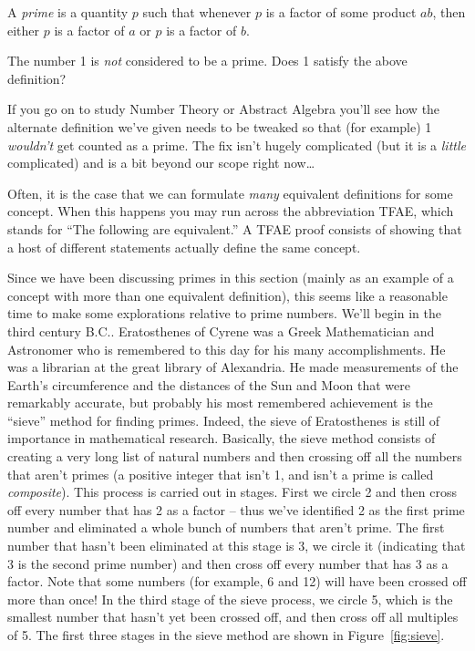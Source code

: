\begin{defi}
A {\em prime} is a quantity $p$ such that whenever $p$ is a 
factor of some product $ab$, then either $p$ is a factor of
$a$ or $p$ is a factor of $b$.
\end{defi}

\begin{exer}
The number 1 is {\em not} considered to be a prime.  Does
1 satisfy the above definition?
\end{exer}

If you go on to study Number Theory or Abstract Algebra you'll see how
the alternate definition we've given needs to be tweaked so that (for example) 
1 \emph{wouldn't} get counted as a prime.  The fix isn't hugely complicated (but it 
is a {\em little} complicated) and is a bit beyond our scope right now\ldots
 
Often, it is the case that we can formulate {\em many} equivalent
definitions for some concept.  When this happens you may run
across the abbreviation TFAE, which stands for ``The following
are equivalent.''  A TFAE proof consists of showing that a host
of different statements actually define the same concept.

Since we have been discussing primes in this section (mainly 
as an example of a concept with more than one equivalent 
definition), this seems like a reasonable time to make some
explorations relative to prime numbers.  We'll begin in the 
third century B.C..   
Eratosthenes of Cyrene was a Greek Mathematician and
Astronomer who is remembered to this day for his many accomplishments.
He was a librarian at the great library of Alexandria.  He made
measurements of the Earth's circumference and the distances of
the Sun and Moon that were remarkably accurate, but probably his
most remembered achievement is the ``sieve'' method for finding
primes.  Indeed, the sieve of Eratosthenes 
is still of importance
in mathematical research.  Basically, the sieve method consists 
of creating a very long list of natural numbers and then crossing
off all the numbers that aren't primes (a positive integer that
isn't 1, and isn't a prime is called \emph{ composite}).  
This process
is carried out in stages.  First we circle 2 and then cross off
every number that has 2 as a factor -- thus we've identified 
2 as the first prime number and eliminated a whole bunch of numbers 
that aren't prime.  The first number that hasn't been eliminated at
this stage is 3, we circle it (indicating that 3 is the second prime
number) and then cross off every number that has 3 as a factor.  Note
that some numbers (for example, 6 and 12) will have been crossed off
more than once!  In the third stage of the sieve process, we circle
5, which is the smallest number that hasn't yet been crossed off, and
then cross off all multiples of 5.  The first three stages in the
sieve method are shown in Figure~\ref{fig:sieve}.

